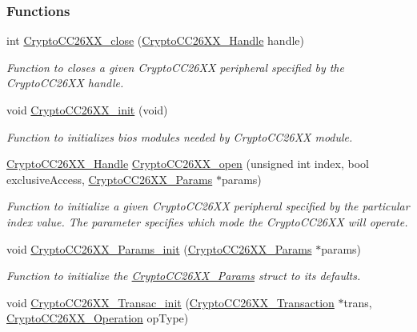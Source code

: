 \subsubsection*{Functions}
\begin{DoxyCompactItemize}
\item 
int \hyperlink{_crypto_c_c26_x_x_8h_aa2ece822f0fd8f6dbd3f50500b03bea4}{Crypto\+C\+C26\+X\+X\+\_\+close} (\hyperlink{_crypto_c_c26_x_x_8h_a8737c63107a1cb5548ba06f7a48259b5}{Crypto\+C\+C26\+X\+X\+\_\+\+Handle} handle)
\begin{DoxyCompactList}\small\item\em Function to closes a given Crypto\+C\+C26\+X\+X peripheral specified by the Crypto\+C\+C26\+X\+X handle. \end{DoxyCompactList}\item 
void \hyperlink{_crypto_c_c26_x_x_8h_a512b301a6ebf10a41c86d9ff725f7749}{Crypto\+C\+C26\+X\+X\+\_\+init} (void)
\begin{DoxyCompactList}\small\item\em Function to initializes bios modules needed by Crypto\+C\+C26\+X\+X module. \end{DoxyCompactList}\item 
\hyperlink{_crypto_c_c26_x_x_8h_a8737c63107a1cb5548ba06f7a48259b5}{Crypto\+C\+C26\+X\+X\+\_\+\+Handle} \hyperlink{_crypto_c_c26_x_x_8h_a21aa1458d0b063ee3637a40487e8ee12}{Crypto\+C\+C26\+X\+X\+\_\+open} (unsigned int index, bool exclusive\+Access, \hyperlink{struct_crypto_c_c26_x_x___params}{Crypto\+C\+C26\+X\+X\+\_\+\+Params} $\ast$params)
\begin{DoxyCompactList}\small\item\em Function to initialize a given Crypto\+C\+C26\+X\+X peripheral specified by the particular index value. The parameter specifies which mode the Crypto\+C\+C26\+X\+X will operate. \end{DoxyCompactList}\item 
void \hyperlink{_crypto_c_c26_x_x_8h_a057c8155f3a7eb9560a51e2d8d4d98e3}{Crypto\+C\+C26\+X\+X\+\_\+\+Params\+\_\+init} (\hyperlink{struct_crypto_c_c26_x_x___params}{Crypto\+C\+C26\+X\+X\+\_\+\+Params} $\ast$params)
\begin{DoxyCompactList}\small\item\em Function to initialize the \hyperlink{struct_crypto_c_c26_x_x___params}{Crypto\+C\+C26\+X\+X\+\_\+\+Params} struct to its defaults. \end{DoxyCompactList}\item 
void \hyperlink{_crypto_c_c26_x_x_8h_afb3ea8faceda234cdd62c5f53e203946}{Crypto\+C\+C26\+X\+X\+\_\+\+Transac\+\_\+init} (\hyperlink{struct_crypto_c_c26_x_x___transaction}{Crypto\+C\+C26\+X\+X\+\_\+\+Transaction} $\ast$trans, \hyperlink{_crypto_c_c26_x_x_8h_a28465385e5b45efecc00f2015605f970}{Crypto\+C\+C26\+X\+X\+\_\+\+Operation} op\+Type)

\end{DoxyCompactItemize}
